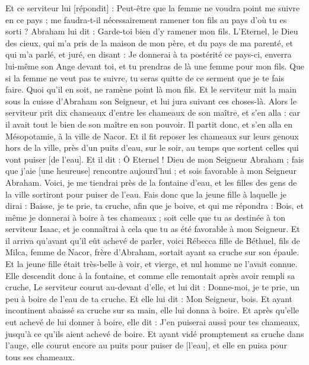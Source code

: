 \begin{multicols}{2}
Et ce serviteur lui [répondit] : Peut-être que la femme ne voudra point me suivre en ce pays ; me faudra-t-il nécessairement ramener ton fils au pays d'où tu es sorti ?
Abraham lui dit : Garde-toi bien d'y ramener mon fils.
L'Eternel, le Dieu des cieux, qui m'a pris de la maison de mon père, et du pays de ma parenté, et qui m'a parlé, et juré, en disant : Je donnerai à ta postérité ce pays-ci, enverra lui-même son Ange devant toi, et tu prendras de là une femme pour mon fils.
Que si la femme ne veut pas te suivre, tu seras quitte de ce serment que je te fais faire. Quoi qu'il en soit, ne ramène point là mon fils.
Et le serviteur mit la main sous la cuisse d'Abraham son Seigneur, et lui jura suivant ces choses-là.
Alors le serviteur prit dix chameaux d'entre les chameaux de son maître, et s'en alla : car il avait tout le bien de son maître en son pouvoir. Il partit donc, et s'en alla en Mésopotamie, à la ville de Nacor.
Et il fit reposer les chameaux sur leurs genoux hors de la ville, près d'un puits d'eau, sur le soir, au temps que sortent celles qui vont puiser [de l'eau].
Et il dit : Ô Eternel ! Dieu de mon Seigneur Abraham ; fais que j'aie [une heureuse] rencontre aujourd'hui ; et sois favorable à mon Seigneur Abraham.
Voici, je me tiendrai près de la fontaine d'eau, et les filles des gens de la ville sortiront pour puiser de l'eau.
Fais donc que la jeune fille à laquelle je dirai : Baisse, je te prie, ta cruche, afin que je boive, et qui me répondra : Bois, et même je donnerai à boire à tes chameaux ; soit celle que tu as destinée à ton serviteur Isaac, et je connaîtrai à cela que tu as été favorable à mon Seigneur.
Et il arriva qu'avant qu'il eût achevé de parler, voici Rébecca fille de Béthuel, fils de Milca, femme de Nacor, frère d'Abraham, sortait ayant sa cruche sur son épaule.
Et la jeune fille était très-belle à voir, et vierge, et nul homme ne l'avait connue. Elle descendit donc à la fontaine, et comme elle remontait après avoir rempli sa cruche,
Le serviteur courut au-devant d'elle, et lui dit : Donne-moi, je te prie, un peu à boire de l'eau de ta cruche.
Et elle lui dit : Mon Seigneur, bois. Et ayant incontinent abaissé sa cruche sur sa main, elle lui donna à boire.
Et après qu'elle eut achevé de lui donner à boire, elle dit : J'en puiserai aussi pour tes chameaux, jusqu'à ce qu'ils aient achevé de boire.
Et ayant vidé promptement sa cruche dans l'auge, elle courut encore au puits pour puiser de [l'eau], et elle en puisa pour tous ses chameaux.

\end{multicols}
